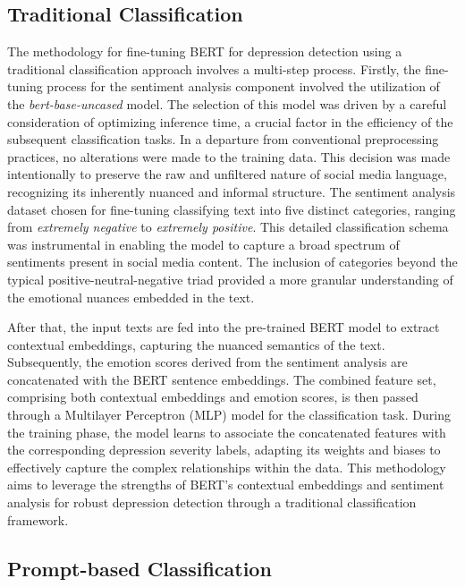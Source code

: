 \documentclass{article}
\begin{document}
\subsection{Traditional Classification}

The methodology for fine-tuning BERT for depression detection using a traditional classification approach involves a multi-step process. Firstly, the fine-tuning process for the sentiment analysis component involved the utilization of the \emph{bert-base-uncased} model. The selection of this model was driven by a careful consideration of optimizing inference time, a crucial factor in the efficiency of the subsequent classification tasks. In a departure from conventional preprocessing practices, no alterations were made to the training data. This decision was made intentionally to preserve the raw and unfiltered nature of social media language, recognizing its inherently nuanced and informal structure. The sentiment analysis dataset chosen for fine-tuning classifying text into five distinct categories, ranging from \emph{extremely negative} to \emph{extremely positive}. This detailed classification schema was instrumental in enabling the model to capture a broad spectrum of sentiments present in social media content. The inclusion of categories beyond the typical positive-neutral-negative triad provided a more granular understanding of the emotional nuances embedded in the text.

After that, the input texts are fed into the pre-trained BERT model to extract contextual embeddings, capturing the nuanced semantics of the text. Subsequently, the emotion scores derived from the sentiment analysis are concatenated with the BERT sentence embeddings. The combined feature set, comprising both contextual embeddings and emotion scores, is then passed through a Multilayer Perceptron (MLP) model for the classification task. During the training phase, the model learns to associate the concatenated features with the corresponding depression severity labels, adapting its weights and biases to effectively capture the complex relationships within the data. This methodology aims to leverage the strengths of BERT's contextual embeddings and sentiment analysis for robust depression detection through a traditional classification framework.

\subsection{Prompt-based Classification}
\end{document}
